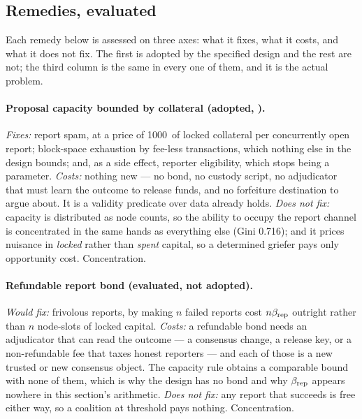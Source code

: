 
\subsection{Remedies, evaluated}
\label{sec:23:remedies}

Each remedy below is assessed on three axes: what it fixes, what it costs, and what it does not
fix. The first is adopted by the specified design and the rest are not; the third column is the
same in every one of them, and it is the actual problem.

\paragraph{Proposal capacity bounded by collateral (adopted, ).}
\emph{Fixes:} report spam, at a price of \num{1000}\flux\ of locked collateral per concurrently open
report; block-space exhaustion by fee-less transactions, which nothing else in the design bounds;
and, as a side effect, reporter eligibility, which stops being a parameter. \emph{Costs:} nothing
new — no bond, no custody script, no adjudicator that must learn the outcome to release funds, and
no forfeiture destination to argue about. It is a validity predicate over data \fluxd{} already
holds. \emph{Does not fix:} capacity is distributed as node counts, so the ability to occupy the
report channel is concentrated in the same hands as everything else (Gini \num{0.716}); and it
prices nuisance in \emph{locked} rather than \emph{spent} capital, so a determined griefer pays
only opportunity cost. Concentration.

\paragraph{Refundable report bond (evaluated, not adopted).} \emph{Would fix:} frivolous reports,
by making $n$ failed reports cost $n\beta_{\mathrm{rep}}$ outright rather than $n$ node-slots of locked capital.
\emph{Costs:} a refundable bond needs an adjudicator that can read the outcome — a consensus change,
a release key, or a non-refundable fee that taxes honest reporters — and each of those is a new
trusted or new consensus object. The capacity rule obtains a comparable bound with none of them,
which is why the design has no bond and why $\beta_{\mathrm{rep}}$ appears nowhere in this section's arithmetic.
\emph{Does not fix:} any report that succeeds is free either way, so a coalition at threshold pays
nothing. Concentration.

